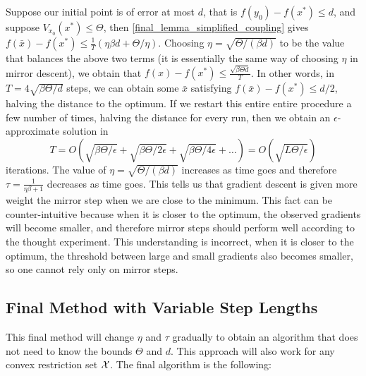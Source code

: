 Suppose our initial point is of error at most $d$, that is $f (y_0 ) − f (x^\ast ) \leq d$, and suppose $V_{x_0}(x^\ast) \leq \Theta$, then \ref{final_lemma_simplified_coupling} gives $f (\bar{x})-f (x^\ast ) \leq \frac{1}{T}\left( \eta \beta d + \Theta/\eta\right)$. Choosing $\eta = \sqrt{\Theta/(\beta d)}$ to be the value that balances the above two terms (it is essentially the same way of choosing $\eta$ in mirror descent), we obtain that $f (x) − f (x^\ast ) \leq \frac{\sqrt{\beta \Theta d}}{T}$. In other words, in $T = 4 \sqrt{\beta\Theta/d}$ steps, we can obtain some $\bar{x}$ satisfying $f (\bar{x}) − f (x^\ast ) \leq d/2$, halving the distance to the optimum. If we restart this entire entire procedure a few number of times, halving the distance for every run, then we obtain an $\epsilon$-approximate solution in
\[
    T = O \left(\sqrt{\beta \Theta / \epsilon} + \sqrt{\beta \Theta / 2\epsilon} + \sqrt{\beta \Theta / 4 \epsilon} + \dots \right) = O\left(\sqrt{L\Theta / \epsilon}  \right)
\]
iterations. The value of $\eta = \sqrt{\Theta/(\beta d)}$ increases as time goes and therefore $\tau = \frac{1}{\eta \beta +1}$ decreases as time goes. This tells us that gradient descent is given more weight the mirror step when we are close to the minimum.  This fact can be counter-intuitive because when it is closer to the optimum, the observed gradients will become smaller, and therefore mirror steps should perform well according to the thought experiment. This understanding is incorrect, when it is closer to the optimum, the threshold between large and small gradients also becomes smaller, so one cannot rely only on mirror steps.

\subsection{Final Method with Variable Step Lengths}
This final method will change $\eta$ and $\tau$ gradually to obtain an algorithm that does not need to know the bounds $\Theta$ and $d$. This approach will also work for any convex restriction set $\mathcal{X}$. The final algorithm is the following:

